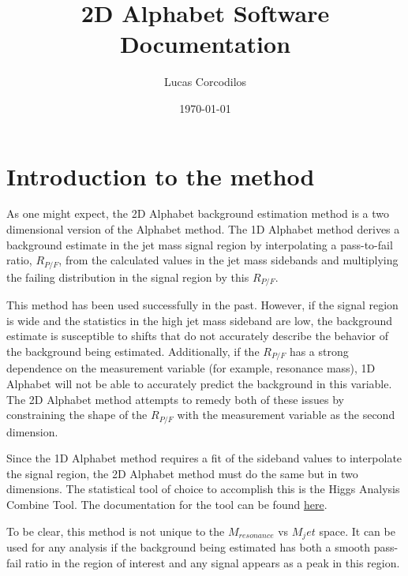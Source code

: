 \documentclass[letter]{article}
\title{2D Alphabet Software Documentation}
\author{Lucas Corcodilos}
\date{\today}
\begin{document}
\maketitle
\titlespacing{\section}{0pt}{5pt}{0pt}
\titlespacing{\subsection}{0pt}{5pt}{0pt}
\titlespacing{\subsubsection}{0pt}{5pt}{0pt}
\setlength{\parskip}{1em}

\section{Introduction to the method}
    As one might expect, the 2D Alphabet background estimation method is a two dimensional version of the Alphabet method. The 1D Alphabet method derives a background estimate in the jet mass signal region by interpolating a pass-to-fail ratio, $R_{P/F}$, from the calculated values in the jet mass sidebands and multiplying the failing distribution in the signal region by this $R_{P/F}$. 

    This method has been used successfully in the past. However, if the signal region is wide and the statistics in the high jet mass sideband are low, the background estimate is susceptible to shifts that do not accurately describe the behavior of the background being estimated. Additionally, if the $R_{P/F}$ has a strong dependence on the measurement variable (for example, resonance mass), 1D Alphabet will not be able to accurately predict the background in this variable. The 2D Alphabet method attempts to remedy both of these issues by constraining the shape of the $R_{P/F}$ with the measurement variable as the second dimension.

    Since the 1D Alphabet method requires a fit of the sideband values to interpolate the signal region, the 2D Alphabet method must do the same but in two dimensions. The statistical tool of choice to accomplish this is the Higgs Analysis Combine Tool. The documentation for the tool can be found \href{https://cms-hcomb.gitbooks.io/combine/content/}{here}. 

    To be clear, this method is not unique to the $M_{resonance}$ vs $M_jet$ space. It can be used for any analysis if the background being estimated has both a smooth pass-fail ratio in the region of interest and any signal appears as a peak in this region.
\end{document}
